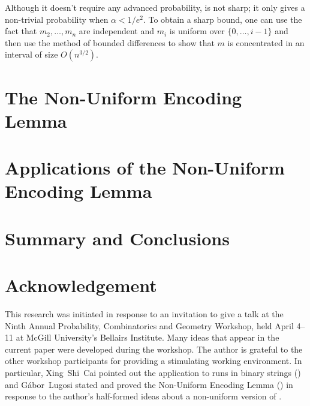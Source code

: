 \documentclass[lotsofwhite]{patmorin}
\begin{document}
\begin{rem}
  Although it doesn't require any advanced probability,
   is not sharp; it only gives a non-trivial
  probability when $\alpha < 1/e^2$.  To obtain a sharp bound, one
  can use the fact that $m_2,\ldots,m_n$ are independent and $m_i$ is
  uniform over $\{0,\ldots,i-1\}$ and then use the method of bounded
  differences \cite{S} to show that $m$ is concentrated in an interval
  of size $O(n^{3/2})$.
\end{rem}




\section{The Non-Uniform Encoding Lemma}

\section{Applications of the Non-Uniform Encoding Lemma}


\section{Summary and Conclusions}


\section*{Acknowledgement}

This research was initiated in response to an invitation to give
a talk at the Ninth Annual Probability, Combinatorics and Geometry
Workshop, held April 4--11 at McGill University's Bellairs Institute.
Many ideas that appear in the current paper were developed during the
workshop. The author is grateful to the other workshop participants for
providing a stimulating working environment.  In particular, Xing~Shi~Cai
pointed out the application to runs in binary strings ()
and G\'abor~Lugosi stated and proved the Non-Uniform Encoding Lemma
() in response to the author's half-formed ideas about a
non-uniform version of .
\end{document}
